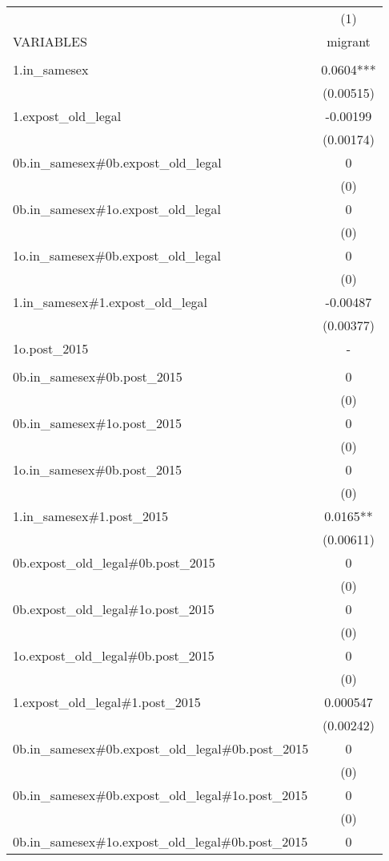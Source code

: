 \documentclass[]{article}
\begin{document}
\begin{tabular}{lc} \hline
 & (1) \\
VARIABLES & migrant \\ \hline
 &  \\
1.in\_samesex & 0.0604*** \\
 & (0.00515) \\
1.expost\_old\_legal & -0.00199 \\
 & (0.00174) \\
0b.in\_samesex\#0b.expost\_old\_legal & 0 \\
 & (0) \\
0b.in\_samesex\#1o.expost\_old\_legal & 0 \\
 & (0) \\
1o.in\_samesex\#0b.expost\_old\_legal & 0 \\
 & (0) \\
1.in\_samesex\#1.expost\_old\_legal & -0.00487 \\
 & (0.00377) \\
1o.post\_2015 & - \\
 &  \\
0b.in\_samesex\#0b.post\_2015 & 0 \\
 & (0) \\
0b.in\_samesex\#1o.post\_2015 & 0 \\
 & (0) \\
1o.in\_samesex\#0b.post\_2015 & 0 \\
 & (0) \\
1.in\_samesex\#1.post\_2015 & 0.0165** \\
 & (0.00611) \\
0b.expost\_old\_legal\#0b.post\_2015 & 0 \\
 & (0) \\
0b.expost\_old\_legal\#1o.post\_2015 & 0 \\
 & (0) \\
1o.expost\_old\_legal\#0b.post\_2015 & 0 \\
 & (0) \\
1.expost\_old\_legal\#1.post\_2015 & 0.000547 \\
 & (0.00242) \\
0b.in\_samesex\#0b.expost\_old\_legal\#0b.post\_2015 & 0 \\
 & (0) \\
0b.in\_samesex\#0b.expost\_old\_legal\#1o.post\_2015 & 0 \\
 & (0) \\
0b.in\_samesex\#1o.expost\_old\_legal\#0b.post\_2015 & 0 \\

\end{tabular}
\end{document}
